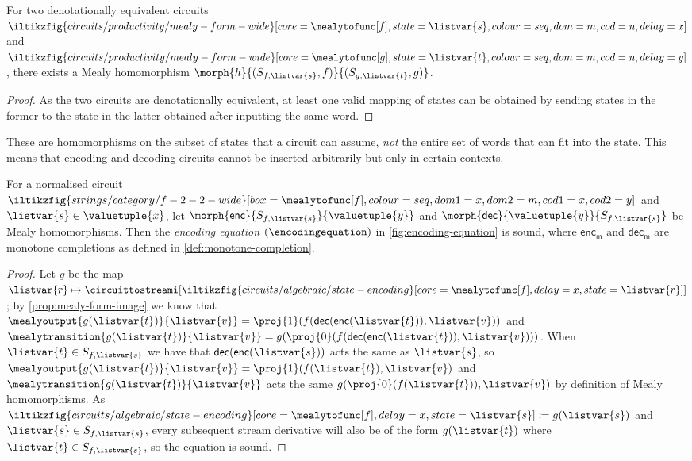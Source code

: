 \begin{proposition}
    For two denotationally equivalent circuits \(
    \iltikzfig{circuits/productivity/mealy-form-wide}[core=\mealytofunc[f],state=\listvar{s},colour=seq,dom=m,cod=n,delay=x]
    \) and \(
    \iltikzfig{circuits/productivity/mealy-form-wide}[core=\mealytofunc[g],state=\listvar{t},colour=seq,dom=m,cod=n,delay=y]
    \), there exists a Mealy homomorphism \(
    \morph{h}{(S_{f,\listvar{s}},f)}{(S_{g,\listvar{t}},g)}
    \).
\end{proposition}
\begin{proof}
    As the two circuits are denotationally equivalent, at least one valid
    mapping of states can be obtained by sending states in the former to the
    state in the latter obtained after inputting the same word.
\end{proof}

These are homomorphisms on the subset of states that a circuit
can assume, \emph{not} the entire set of words that can fit into the state.
This means that encoding and decoding circuits cannot be inserted arbitrarily
but only in certain contexts.

\begin{proposition}\label{prop:encoding-equation}
    For a normalised circuit \(
    \iltikzfig{strings/category/f-2-2-wide}[box=\mealytofunc[f],colour=seq,dom1=x,dom2=m,cod1=x,cod2=y]
    \) and \(\listvar{s} \in \valuetuple{x}\), let
    \(\morph{\mathsf{enc}}{S_{f,\listvar{s}}}{\valuetuple{y}}\) and
    \(\morph{\mathsf{dec}}{\valuetuple{y}}{S_{f, \listvar{s}}}\) be Mealy
    homomorphisms.
    Then the \emph{encoding equation} \((\encodingequation)\) in
    \cref{fig:encoding-equation} is sound, where
    \(\mathsf{enc}_\mathsf{m}\) and \(\mathsf{dec}_\mathsf{m}\) are monotone
    completions as defined in \cref{def:monotone-completion}.
\end{proposition}
\begin{proof}
    Let \(g\) be the map \(\listvar{r} \mapsto
    \circuittostreami[\iltikzfig{circuits/algebraic/state-encoding}[core=\mealytofunc[f],delay=x,state=\listvar{r}]]
    \); by \cref{prop:mealy-form-image} we know that \(
    \mealyoutput{g(\listvar{t})}{\listvar{v}}
    =
    \proj{1}(f(\mathsf{dec}(\mathsf{enc}(\listvar{t})), \listvar{v}))
    \) and \(
    \mealytransition{g(\listvar{t})}{\listvar{v}}
    =
    g(\proj{0}(f(\mathsf{dec}(\mathsf{enc}(\listvar{t})), \listvar{v})))
    \).
    When \(\listvar{t} \in S_{f, \listvar{s}}\) we have that \(
    \mathsf{dec}(\mathsf{enc}(\listvar{s}))\) acts the same as
    \(\listvar{s}\),
    so
    \(
    \mealyoutput{g(\listvar{t})}{\listvar{v}}
    =
    \proj{1}(f(\listvar{t}), \listvar{v})
    \) and \(
    \mealytransition{g(\listvar{t})}{\listvar{v}}
    \) acts the same \(
    g(\proj{0}(f(\listvar{t})), \listvar{v})
    \) by definition of Mealy homomorphisms.
    As \(
    \iltikzfig{circuits/algebraic/state-encoding}[core=\mealytofunc[f],delay=x,state=\listvar{s}]
    \coloneqq
    g(\listvar{s})
    \) and \(\listvar{s} \in S_{f,\listvar{s}}\),
    every subsequent stream derivative will also be of the form
    \(g(\listvar{t})\) where \(\listvar{t} \in S_{f,\listvar{s}}\), so the
    equation is sound.
\end{proof}

